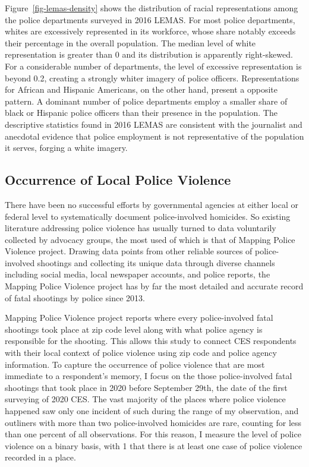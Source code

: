 \documentclass[
  12pt,
]{article}
\begin{document}
Figure~\ref{fig-lemas-density} shows the distribution of racial
representations among the police departments surveyed in 2016 LEMAS. For
most police departments, whites are excessively represented in its
workforce, whose share notably exceeds their percentage in the overall
population. The median level of white representation is greater than 0
and its distribution is apparently right-skewed. For a considerable
number of departments, the level of excessive representation is beyond
0.2, creating a strongly whiter imagery of police officers.
Representations for African and Hispanic Americans, on the other hand,
present a opposite pattern. A dominant number of police departments
employ a smaller share of black or Hispanic police officers than their
presence in the population. The descriptive statistics found in 2016
LEMAS are consistent with the journalist and anecdotal evidence that
police employment is not representative of the population it serves,
forging a white imagery.

\hypertarget{occurrence-of-local-police-violence}{%
\subsection{Occurrence of Local Police
Violence}\label{occurrence-of-local-police-violence}}

There have been no successful efforts by governmental agencies at either
local or federal level to systematically document police-involved
homicides. So existing literature addressing police violence has usually
turned to data voluntarily collected by advocacy groups, the most used
of which is that of Mapping Police Violence project. Drawing data points
from other reliable sources of police-involved shootings and collecting
its unique data through diverse channels including social media, local
newspaper accounts, and police reports, the Mapping Police Violence
project has by far the most detailed and accurate record of fatal
shootings by police since 2013.

Mapping Police Violence project reports where every police-involved
fatal shootings took place at zip code level along with what police
agency is responsible for the shooting. This allows this study to
connect CES respondents with their local context of police violence
using zip code and police agency information. To capture the occurrence
of police violence that are most immediate to a respondent's memory, I
focus on the those police-involved fatal shootings that took place in
2020 before September 29th, the date of the first surveying of 2020 CES.
The vast majority of the places where police violence happened saw only
one incident of such during the range of my observation, and outliners
with more than two police-involved homicides are rare, counting for less
than one percent of all observations. For this reason, I measure the
level of police violence on a binary basis, with 1 that there is at
least one case of police violence recorded in a place.
\end{document}
